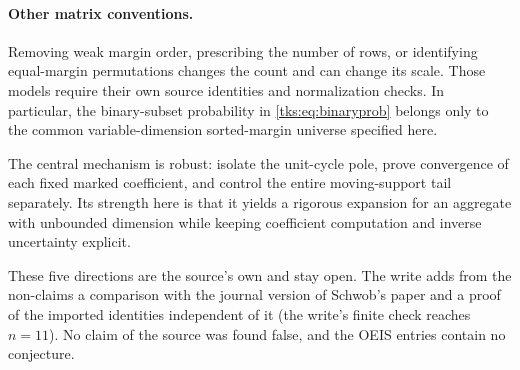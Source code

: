 \paragraph{Other matrix conventions.}
Removing weak margin order, prescribing the number of rows, or identifying equal-margin permutations changes the count and can change its scale. Those models require their own source identities and normalization checks. In particular, the binary-subset probability in \eqref{tks:eq:binaryprob} belongs only to the common variable-dimension sorted-margin universe specified here.

The central mechanism is robust: isolate the unit-cycle pole, prove convergence of each fixed marked coefficient, and control the entire moving-support tail separately. Its strength here is that it yields a rigorous expansion for an aggregate with unbounded dimension while keeping coefficient computation and inverse uncertainty explicit.
\begin{writenote}
These five directions are the source's own and stay open. The write adds from
the non-claims a comparison with the journal version of Schwob's paper and a
proof of the imported identities independent of it (the write's finite check
reaches $n=11$). No claim of the source was found false, and the OEIS entries
contain no conjecture.
\end{writenote}
